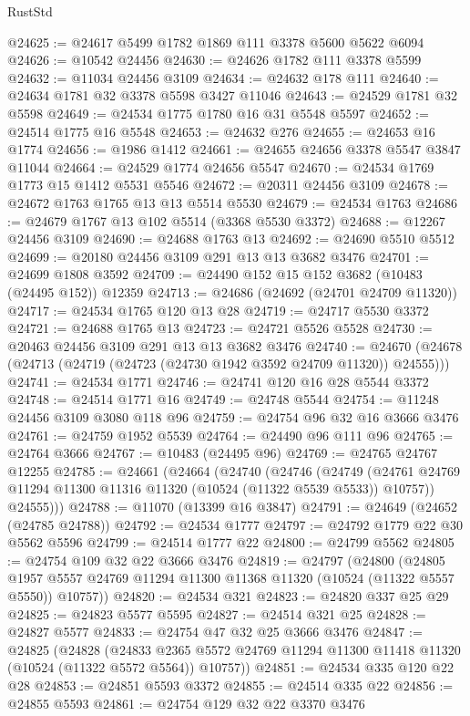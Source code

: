 \begin{lexlean}{RustStd}
\begin{coremodule}
@24625 := @24617 @5499 @1782 @1869 @111 @3378 @5600 @5622 @6094
@24626 := @10542 @24456
@24630 := @24626 @1782 @111 @3378 @5599
@24632 := @11034 @24456 @3109
@24634 := @24632 @178 @111
@24640 := @24634 @1781 @32 @3378 @5598 @3427 @11046
@24643 := @24529 @1781 @32 @5598
@24649 := @24534 @1775 @1780 @16 @31 @5548 @5597
@24652 := @24514 @1775 @16 @5548
@24653 := @24632 @276
@24655 := @24653 @16 @1774
@24656 := @1986 @1412
@24661 := @24655 @24656 @3378 @5547 @3847 @11044
@24664 := @24529 @1774 @24656 @5547
@24670 := @24534 @1769 @1773 @15 @1412 @5531 @5546
@24672 := @20311 @24456 @3109
@24678 := @24672 @1763 @1765 @13 @13 @5514 @5530
@24679 := @24534 @1763
@24686 := @24679 @1767 @13 @102 @5514 (@3368 @5530 @3372)
@24688 := @12267 @24456 @3109
@24690 := @24688 @1763 @13
@24692 := @24690 @5510 @5512
@24699 := @20180 @24456 @3109 @291 @13 @13 @3682 @3476
@24701 := @24699 @1808 @3592
@24709 := @24490 @152 @15 @152 @3682 (@10483 (@24495 @152)) @12359
@24713 := @24686 (@24692 (@24701 @24709 @11320))
@24717 := @24534 @1765 @120 @13 @28
@24719 := @24717 @5530 @3372
@24721 := @24688 @1765 @13
@24723 := @24721 @5526 @5528
@24730 := @20463 @24456 @3109 @291 @13 @13 @3682 @3476
@24740 := @24670 (@24678 (@24713 (@24719 (@24723 (@24730 @1942 @3592 @24709 @11320)) @24555)))
@24741 := @24534 @1771
@24746 := @24741 @120 @16 @28 @5544 @3372
@24748 := @24514 @1771 @16
@24749 := @24748 @5544
@24754 := @11248 @24456 @3109 @3080 @118 @96
@24759 := @24754 @96 @32 @16 @3666 @3476
@24761 := @24759 @1952 @5539
@24764 := @24490 @96 @111 @96
@24765 := @24764 @3666
@24767 := @10483 (@24495 @96)
@24769 := @24765 @24767 @12255
@24785 := @24661
    (@24664
      (@24740
        (@24746
          (@24749 (@24761 @24769 @11294 @11300 @11316 @11320 (@10524 (@11322 @5539 @5533)) @10757))
          @24555)))
@24788 := @11070 (@13399 @16 @3847)
@24791 := @24649 (@24652 (@24785 @24788))
@24792 := @24534 @1777
@24797 := @24792 @1779 @22 @30 @5562 @5596
@24799 := @24514 @1777 @22
@24800 := @24799 @5562
@24805 := @24754 @109 @32 @22 @3666 @3476
@24819 := @24797
    (@24800
      (@24805 @1957 @5557 @24769 @11294 @11300 @11368 @11320 (@10524 (@11322 @5557 @5550)) @10757))
@24820 := @24534 @321
@24823 := @24820 @337 @25 @29
@24825 := @24823 @5577 @5595
@24827 := @24514 @321 @25
@24828 := @24827 @5577
@24833 := @24754 @47 @32 @25 @3666 @3476
@24847 := @24825
    (@24828
      (@24833 @2365 @5572 @24769 @11294 @11300 @11418 @11320 (@10524 (@11322 @5572 @5564)) @10757))
@24851 := @24534 @335 @120 @22 @28
@24853 := @24851 @5593 @3372
@24855 := @24514 @335 @22
@24856 := @24855 @5593
@24861 := @24754 @129 @32 @22 @3370 @3476

\end{coremodule}
\end{lexlean}
